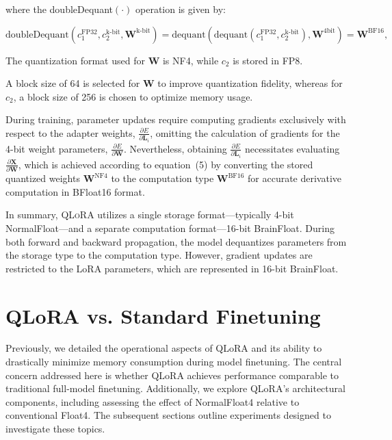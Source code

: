 where the doubleDequant$(\cdot)$ operation is given by:

\begin{equation}
    \text{doubleDequant}(c_1^{\text{FP32}}, c_2^{\text{k-bit}}, \mathbf{W}^{\text{k-bit}}) = \text{dequant}(\text{dequant}(c_1^{\text{FP32}}, c_2^{\text{k-bit}}), \mathbf{W}^{\text{4bit}}) = \mathbf{W}^{\text{BF16}},
\end{equation}

The quantization format used for $\mathbf{W}$ is NF4, while $c_2$ is stored in FP8.

A block size of 64 is selected for $\mathbf{W}$ to improve quantization fidelity, whereas for $c_2$, a block size of 256 is chosen to optimize memory usage.

During training, parameter updates require computing gradients exclusively with respect to the adapter weights, $\frac{\partial E}{\partial \mathbf{L}_i}$, omitting the calculation of gradients for the 4-bit weight parameters, $\frac{\partial E}{\partial \mathbf{W}}$. Nevertheless, obtaining $\frac{\partial E}{\partial \mathbf{L}_i}$ necessitates evaluating $\frac{\partial \mathbf{X}}{\partial \mathbf{W}}$, which is achieved according to equation~(5) by converting the stored quantized weights $\mathbf{W}^{\text{NF4}}$ to the computation type $\mathbf{W}^{\text{BF16}}$ for accurate derivative computation in BFloat16 format.

In summary, \textsc{QLoRA} utilizes a single storage format—typically 4-bit NormalFloat—and a separate computation format—16-bit BrainFloat. During both forward and backward propagation, the model dequantizes parameters from the storage type to the computation type. However, gradient updates are restricted to the LoRA parameters, which are represented in 16-bit BrainFloat.

\section{QLoRA vs. Standard Finetuning}
\label{sec:comp_to_std}

Previously, we detailed the operational aspects of QLoRA and its ability to drastically minimize memory consumption during model finetuning. The central concern addressed here is whether QLoRA achieves performance comparable to traditional full-model finetuning. Additionally, we explore QLoRA's architectural components, including assessing the effect of NormalFloat4 relative to conventional Float4. The subsequent sections outline experiments designed to investigate these topics.

